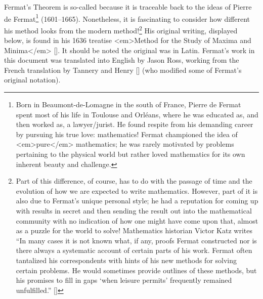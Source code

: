 \begin{refsection}
 Fermat's Theorem is so-called because it is traceable back to the
 ideas of Pierre de Fermat\footnote{Born in Beaumont-de-Lomagne in the
   south of France, Pierre de Fermat spent most of his life in
   Toulouse and Orl\'{e}ans, where he was educated as, and then worked
   as, a lawyer/jurist.  He found respite from his demanding career by
   pursuing his true love: mathematics!  Fermat championed the idea of
   <em>pure</em> mathematics; he was rarely motivated by problems
   pertaining to the physical world but rather loved mathematics for
   its own inherent beauty and challenge.} (1601--1665).  Nonetheless,
 it is fascinating to consider how different his method looks from the
 modern method!\footnote{Part of this difference, of course, has to do
   with the passage of time and the evolution of how we are expected
   to write mathematics.  However, part of it is also due to Fermat's
   unique personal style; he had a reputation for coming up with
   results in secret and then sending the result out into the
   mathematical community with no indication of how one might have
   come upon that, almost as a puzzle for the world to solve!
   Mathematics historian Victor Katz writes ``In many cases it is not
   known what, if any, proofs Fermat constructed nor is there always a
   systematic account of certain parts of his work.  Fermat often
   tantalized his correspondents with hints of his new methods for
   solving certain problems.  He would sometimes provide outlines of
   these methods, but his promises to fill in gaps `{\sf when leisure
     permits}' frequently remained unfulfilled.'' [\cite[page
   433]{Katz}]} His original writing, displayed below, is found in his
 1636 treatise <em>Method for the Study of Maxima and Minima</em>
 [\cite{FermatMaxMin}].  It should be noted the original was in
 Latin. Fermat's work in this document was translated into English by
 Jason Ross, working from the French translation by Tannery and Henry
 [\cite{Tannery}] (who modified some of Fermat's original notation).

\begin{source}


\end{source}
\end{refsection}
